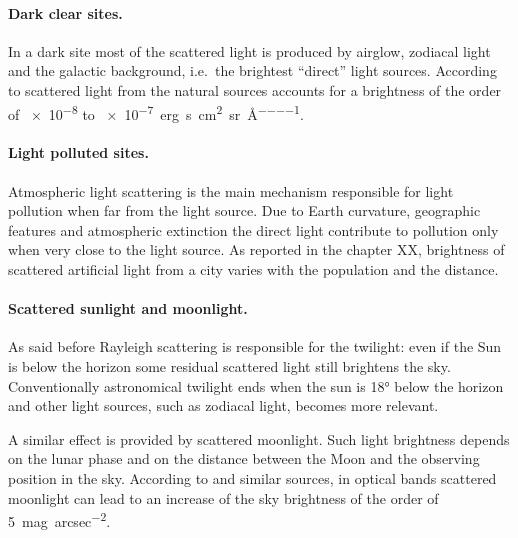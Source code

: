\paragraph{Dark clear sites.} In a dark site most of the scattered light is produced by airglow, zodiacal light and the galactic background, i.e.\ the brightest ``direct'' light sources. According to \cite{leinert19981997} scattered light from the natural sources accounts for a brightness of the order of \num{e-8} to \SI{e-7}{erg\per\second \per\centi\metre\squared \per\steradian\per\angstrom}.

\paragraph{Light polluted sites.} Atmospheric light scattering is the main mechanism responsible for light pollution when far from the light source. Due to Earth curvature, geographic features and atmospheric extinction the direct light contribute to pollution only when very close to the light source. As reported in the chapter XX, brightness of scattered artificial light from a city varies with the population and the distance.

\paragraph{Scattered sunlight and moonlight.} As said before Rayleigh scattering is responsible for the twilight: even if the Sun is below the horizon some residual scattered light still brightens the sky. Conventionally astronomical twilight ends when the sun is \ang{18} below the horizon and other light sources, such as zodiacal light, becomes more relevant.

A similar effect is provided by scattered moonlight. Such light brightness depends on the lunar phase and on the distance between the Moon and the observing position in the sky. According to \cite{krisciunas1991model} and similar sources, in optical bands scattered moonlight can lead to an increase of the sky brightness of the order of \SI{5}{mag\per {arcsec}\squared}.